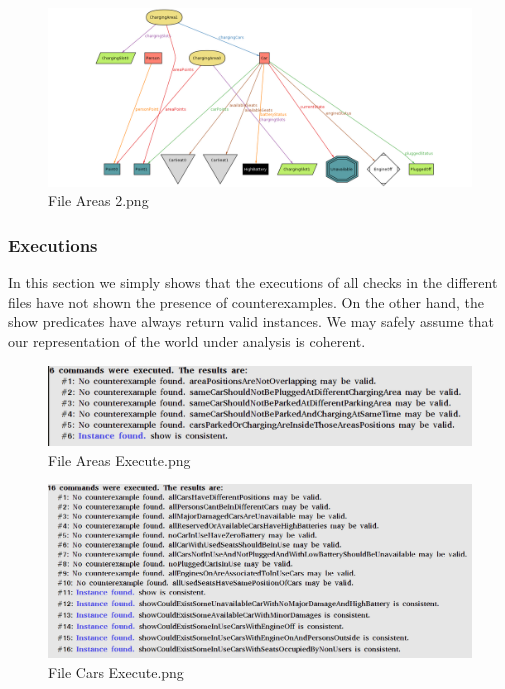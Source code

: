 \FloatBarrier
\begin{figure}[!htbp]
\centering
\includegraphics[width=\linewidth,keepaspectratio]{../Alloy/Exported/Images/Areas_2.png}
\caption{File Areas 2.png}
\label{fig:Area2}
\end{figure}
\FloatBarrier

\subsubsection{Executions}
In this section we simply shows that the executions of all checks in the different files have not shown the presence of counterexamples. On the other hand, the show predicates have always return valid instances. We may safely assume that our representation of the world under analysis is coherent.

\begin{figure}[!htbp]
\centering
\includegraphics[width=\linewidth,keepaspectratio]{../Alloy/Exported/Images/Areas_Execute.png}
\caption{File Areas Execute.png}
\end{figure}
\FloatBarrier
\begin{figure}[!htbp]
\centering
\includegraphics[width=\linewidth,keepaspectratio]{../Alloy/Exported/Images/Cars_Execute.png}
\caption{File Cars Execute.png}
\end{figure}
\FloatBarrier
